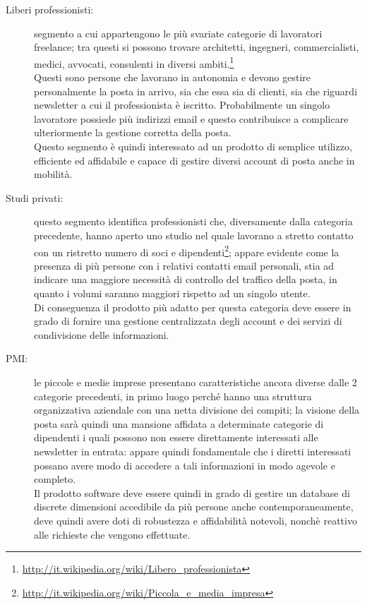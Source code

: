 \begin{description}
\item[Liberi professionisti:] segmento a cui appartengono le più svariate categorie di lavoratori freelance; tra questi si possono trovare architetti, ingegneri, commercialisti, medici, avvocati, consulenti in diversi ambiti.\footnote{\url{http://it.wikipedia.org/wiki/Libero\_professionista}}\\
Questi sono persone che lavorano in autonomia e devono gestire personalmente la posta in arrivo, sia che essa sia di clienti, sia che riguardi newsletter a cui il professionista è iscritto. Probabilmente un singolo lavoratore possiede più indirizzi email e questo contribuisce a complicare ulteriormente la gestione corretta della posta.\\
Questo segmento è quindi interessato ad un prodotto di semplice utilizzo, efficiente ed affidabile e capace di gestire diversi account di posta anche in mobilità.
\item[Studi privati:] questo segmento identifica professionisti che, diversamente dalla categoria precedente, hanno aperto uno studio nel quale lavorano a stretto contatto con un ristretto numero di soci e dipendenti\footnote{\url{http://it.wikipedia.org/wiki/Piccola\_e\_media\_impresa}}; appare evidente come la presenza di più persone con i relativi contatti email personali, stia ad indicare una maggiore necessità di controllo del traffico della posta, in quanto i volumi saranno maggiori rispetto ad un singolo utente.\\
Di conseguenza il prodotto più adatto per questa categoria deve essere in grado di fornire una gestione centralizzata degli account e dei servizi di condivisione delle informazioni.\\
\item[PMI:] le piccole e medie imprese presentano caratteristiche ancora diverse dalle 2 categorie precedenti, in primo luogo perché hanno una struttura organizzativa aziendale con una netta divisione dei compiti; la visione della posta sarà quindi una mansione affidata a determinate categorie di dipendenti i quali possono non essere direttamente interessati alle newsletter in entrata: appare quindi fondamentale che i diretti interessati possano avere modo di accedere a tali informazioni in modo agevole e completo.\\
Il prodotto software deve essere quindi in grado di gestire un database di discrete dimensioni accedibile da più persone anche contemporaneamente, deve quindi avere doti di robustezza e affidabilità notevoli, nonchè reattivo alle richieste che vengono effettuate.
\end{description}

